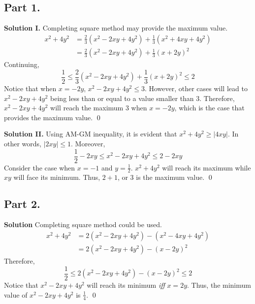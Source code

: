 \documentclass{article}
\newenvironment{solution}{\begin{trivlist}\item[]{\bf Solution}}{\qed \end{trivlist}}
\begin{document}
\subsection*{Part 1.}
\textbf{Solution I.} Completing square method may provide the maximum value.
\begin{align*}
    x^2 + 4y^2
    &= \frac{2}{3} \left( x^2 - 2xy + 4y^2 \right) + \frac{1}{3} \left( x^2 + 4xy + 4y^2 \right) \\
    &= \frac{2}{3} \left( x^2 - 2xy + 4y^2 \right) + \frac{1}{3} (x + 2y)^2
\end{align*}
Continuing,
\[
\frac{1}{2} \leq \frac{2}{3} \left( x^2 - 2xy + 4y^2 \right) + \frac{1}{3} (x + 2y)^2 \leq 2
\]
Notice that when $x = -2y$, $x^2 - 2xy + 4y^2 \leq 3$. However, other cases will lead to $x^2 - 2xy + 4y^2$ being less than or equal to a value smaller than $3$. Therefore, $x^2 - 2xy + 4y^2$ will reach the maximum $3$ when $x = -2y$, which is the case that provides the maximum value.
\qed

\textbf{Solution II.} Using AM-GM inequality, it is evident that $x^2 + 4y^2 \geq |4xy|$. In other words, $|2xy| \leq 1$. Moreover,
\[
\frac{1}{2} - 2xy \leq x^2 - 2xy + 4y^2 \leq 2 - 2xy
\]
Consider the case when $x = -1$ and $y = \frac{1}{2}$. $x^2 + 4y^2$ will reach its maximum while $xy$ will face its minimum. Thus, $2 + 1$, or $\boxed{3}$ is the maximum value.
\qed

\subsection*{Part 2.}
\begin{solution}
Completing square method could be used.
\begin{align*}
    x^2 + 4y^2
    &= 2 \left( x^2 - 2xy + 4y^2 \right) - (x^2 - 4xy + 4y^2) \\
    &= 2 \left( x^2 - 2xy + 4y^2 \right) - (x - 2y)^2
\end{align*}
Therefore,
\[
\frac{1}{2} \leq 2 \left( x^2 - 2xy + 4y^2 \right) - (x - 2y)^2 \leq 2
\]
Notice that $x^2 - 2xy + 4y^2$ will reach its minimum \textit{iff} $x = 2y$. Thus, the minimum value of $x^2 - 2xy + 4y^2$ is $\boxed{\frac{1}{4}}$.
\end{solution}
\end{document}

